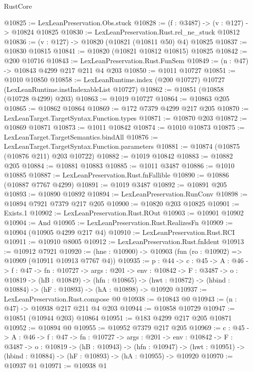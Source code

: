\begin{lexlean}{RustCore}
\begin{coremodule}
@10825 := LexLeanPreservation.Obs.stuck
@10828 := (f : @3487) -> (v : @127) -> @10824 @10825
@10830 := LexLeanPreservation.Rust.rel_ne_stuck @10812
@10836 := (v : @127) -> @10820 (@10821 (@10811 @50) @4) @10825
@10837 := @10830 @10815
@10841 := @10820 (@10821 @10812 @10815) @10825
@10842 := @200 @10716
@10843 := LexLeanPreservation.Rust.FunSem
@10849 := (n : @47) -> @10843 @4299 @217 @211 @4 @203
@10850 := @1011 @10727
@10851 := @1010 @10850
@10858 := LexLeanRuntime.index (@200 @10727) @10727 (LexLeanRuntime.instIndexableList @10727)
@10862 := @10851 (@10858 (@10728 @4299) @203)
@10863 := @1019 @10727
@10864 := @10863 @205
@10865 := @10862 @10864
@10869 := @172 @7379 @4299 @217 @205
@10870 := LexLeanTarget.TargetSyntax.Function.types
@10871 := @10870 @203
@10872 := @10869 @10871
@10873 := @1011 @10842
@10874 := @1010 @10873
@10875 := LexLeanTarget.TargetSemantics.bindAll
@10876 := LexLeanTarget.TargetSyntax.Function.parameters
@10881 := @10874 (@10875 (@10876 @211) @203 @10722)
@10882 := @1019 @10842
@10883 := @10882 @205
@10884 := @10881 @10883
@10885 := @1011 @3487
@10886 := @1010 @10885
@10887 := LexLeanPreservation.Rust.fnFallible
@10890 := @10886 (@10887 @7767 @4299)
@10891 := @1019 @3487
@10892 := @10891 @205
@10893 := @10890 @10892
@10894 := LexLeanPreservation.RunConv
@10898 := @10894 @7921 @7379 @217 @205
@10900 := @10820 @203 @10825
@10901 := Exists.{1}
@10902 := LexLeanPreservation.Rust.ROut
@10903 := @10901 @10902
@10904 := And
@10905 := LexLeanPreservation.Rust.RealizesFn
@10909 := @10904 (@10905 @4299 @217 @4)
@10910 := LexLeanPreservation.Rust.RCI
@10911 := @10910 @8005
@10912 := LexLeanPreservation.Rust.fnIdent
@10913 := @10912 @7921
@10920 := (hne : @10900) -> @10903 (fun (ro : @10902) => @10909 (@10911 @10913 @7767 @4))
@10935 := {p : @44} ->
  {c : @45} ->
  {A : @46} ->
  {f : @47} ->
  {fn : @10727} ->
  {args : @201} ->
  {env : @10842} ->
  {F : @3487} ->
  {o : @10819} ->
  (hB : @10849) ->
  (hfn : @10865) -> (hwt : @10872) -> (hbind : @10884) -> (hF : @10893) -> (hA : @10898) -> @10920
@10937 := LexLeanPreservation.Rust.compose @0
@10938 := @10843 @0
@10943 := (n : @47) -> @10938 @217 @211 @4 @203
@10944 := @10858 @10729
@10947 := @10851 (@10944 @203) @10864
@10951 := @183 @4299 @217 @205 @10871
@10952 := @10894 @0
@10955 := @10952 @7379 @217 @205
@10969 := {c : @45} ->
  {A : @46} ->
  {f : @47} ->
  {fn : @10727} ->
  {args : @201} ->
  {env : @10842} ->
  {F : @3487} ->
  {o : @10819} ->
  (hB : @10943) ->
  (hfn : @10947) -> (hwt : @10951) -> (hbind : @10884) -> (hF : @10893) -> (hA : @10955) -> @10920
@10970 := @10937 @1
@10971 := @10938 @1

\end{coremodule}
\end{lexlean}
